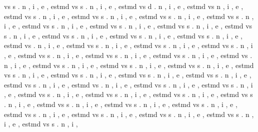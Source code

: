 \documentclass{article}%
\begin{document}
vs s . n , i , e , estmd\newline%
vs s . n , i , e , estmd\newline%
vs d . n , i , e , estmd\newline%
vs n , i , e , estmd\newline%
vs s . n , i , e , estmd\newline%
vs s . n , i , e , estmd\newline%
vs s . n , i , e , estmd\newline%
vs s . n , i , e , estmd\newline%
vs s . n , i , e , estmd\newline%
vs s . n , i , e , estmd\newline%
vs s . n , i , e , estmd\newline%
vs s . n , i , e , estmd\newline%
vs s . n , i , e , estmd\newline%
vs s . n , i , e , estmd\newline%
vs s . n , i , e , estmd\newline%
vs . n , i , e , estmd\newline%
vs s . n , i , e , estmd\newline%
vs s . n , i , e , estmd\newline%
vs s . n , i , e , estmd\newline%
vs s . n , i , e , estmd\newline%
vs s . n , i , e , estmd\newline%
vs s . n , i , e , estmd\newline%
vs . n , i , e , estmd\newline%
vs s . n , i , e , estmd\newline%
vs s . n , i , e , estmd\newline%
vs s . n , i , e , estmd\newline%
vs s . n , i , e , estmd\newline%
vs s . n , i , e , estmd\newline%
vs s . n , i , e , estmd\newline%
vs s . n , i , e , estmd\newline%
vs s . n , i , e , estmd\newline%
vs . n , i , e , estmd\newline%
vs s . n , i , e , estmd\newline%
vs s . n , i , e , estmd\newline%
vs s . n , i , e , estmd\newline%
vs s . n , i , e , estmd\newline%
vs s . n , i , e , estmd\newline%
vs s . n , i , e , estmd\newline%
vs s . n , i , e , estmd\newline%
vs s . n , i , e , estmd\newline%
vs s . n , i , e , estmd\newline%
vs s . n , i , e , estmd\newline%
vs s . n , i , e , estmd\newline%
vs s . n , i , e , estmd\newline%
vs s . n , i , e , estmd\newline%
vs s . n , i ,
\end{document}
